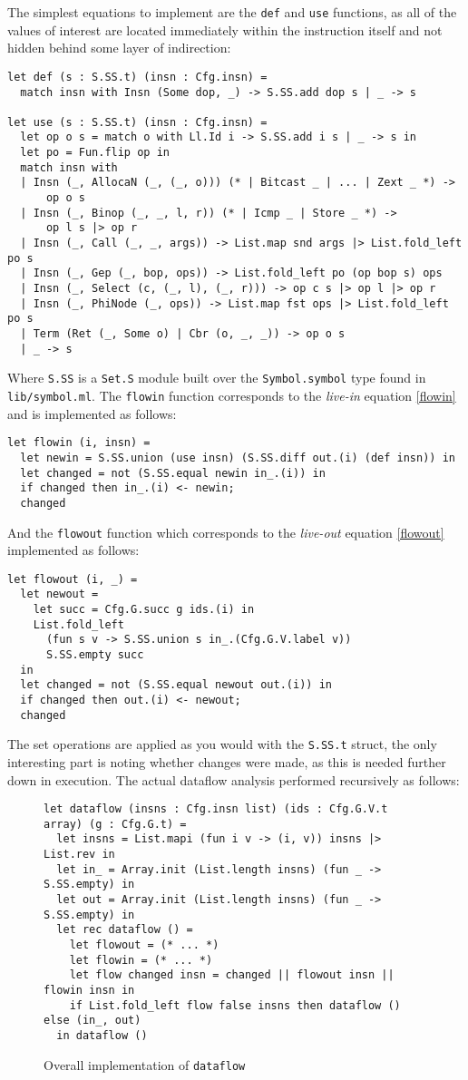 \documentclass{article}
\begin{document}
The simplest equations to implement are the \texttt{def} and \texttt{use} functions, as all of the values of interest are located immediately within the instruction itself and not hidden behind some layer of indirection:
\begin{verbatim}
let def (s : S.SS.t) (insn : Cfg.insn) =
  match insn with Insn (Some dop, _) -> S.SS.add dop s | _ -> s

let use (s : S.SS.t) (insn : Cfg.insn) =
  let op o s = match o with Ll.Id i -> S.SS.add i s | _ -> s in
  let po = Fun.flip op in
  match insn with
  | Insn (_, AllocaN (_, (_, o))) (* | Bitcast _ | ... | Zext _ *) ->
      op o s
  | Insn (_, Binop (_, _, l, r)) (* | Icmp _ | Store _ *) ->
      op l s |> op r
  | Insn (_, Call (_, _, args)) -> List.map snd args |> List.fold_left po s
  | Insn (_, Gep (_, bop, ops)) -> List.fold_left po (op bop s) ops
  | Insn (_, Select (c, (_, l), (_, r))) -> op c s |> op l |> op r
  | Insn (_, PhiNode (_, ops)) -> List.map fst ops |> List.fold_left po s
  | Term (Ret (_, Some o) | Cbr (o, _, _)) -> op o s
  | _ -> s
\end{verbatim}
Where \texttt{S.SS} is a \texttt{Set.S} module built over the \texttt{Symbol.symbol} type found in \texttt{lib/symbol.ml}. The \texttt{flowin} function corresponds to the \textit{live-in} equation \eqref{flowin} and is implemented as follows:
\begin{verbatim}
let flowin (i, insn) =
  let newin = S.SS.union (use insn) (S.SS.diff out.(i) (def insn)) in
  let changed = not (S.SS.equal newin in_.(i)) in
  if changed then in_.(i) <- newin;
  changed
\end{verbatim}
And the \texttt{flowout} function which corresponds to the \textit{live-out} equation \eqref{flowout} implemented as follows:
\begin{verbatim}
let flowout (i, _) =
  let newout =
    let succ = Cfg.G.succ g ids.(i) in
    List.fold_left
      (fun s v -> S.SS.union s in_.(Cfg.G.V.label v))
      S.SS.empty succ
  in
  let changed = not (S.SS.equal newout out.(i)) in
  if changed then out.(i) <- newout;
  changed
\end{verbatim}
The set operations are applied as you would with the \texttt{S.SS.t} struct, the only interesting part is noting whether changes were made, as this is needed further down in execution. The actual dataflow analysis performed recursively as follows:
\begin{figure}[H]
\begin{verbatim}
let dataflow (insns : Cfg.insn list) (ids : Cfg.G.V.t array) (g : Cfg.G.t) =
  let insns = List.mapi (fun i v -> (i, v)) insns |> List.rev in
  let in_ = Array.init (List.length insns) (fun _ -> S.SS.empty) in
  let out = Array.init (List.length insns) (fun _ -> S.SS.empty) in
  let rec dataflow () =
    let flowout = (* ... *)
    let flowin = (* ... *)
    let flow changed insn = changed || flowout insn || flowin insn in
    if List.fold_left flow false insns then dataflow () else (in_, out)
  in dataflow ()
\end{verbatim}
\caption{Overall implementation of \texttt{dataflow}\label{fig:dataflow}}
\end{figure}
\end{document}
